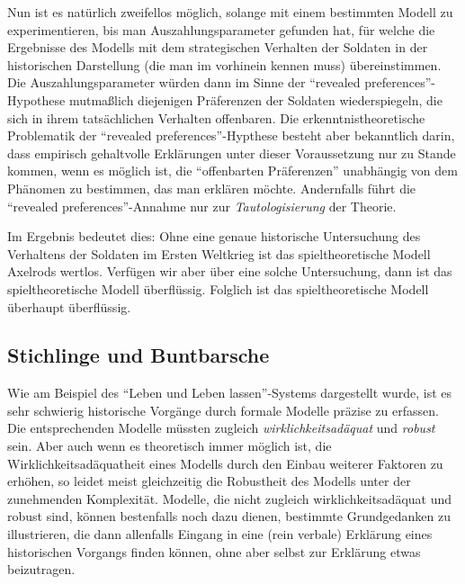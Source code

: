 \documentclass[12pt,a4paper,ngerman]{article}
\begin{document}
Nun ist es natürlich zweifellos möglich, solange mit einem bestimmten
Modell zu experimentieren, bis man Auszahlungsparameter gefunden hat,
für welche die Ergebnisse des Modells mit dem strategischen Verhalten
der Soldaten in der historischen Darstellung (die man im vorhinein
kennen muss) übereinstimmen. Die Auszahlungsparameter würden dann im
Sinne der "`revealed preferences"'-Hypothese mutmaßlich diejenigen
Präferenzen der Soldaten wiederspiegeln, die sich in ihrem
tatsächlichen Verhalten offenbaren. Die erkenntnistheoretische
Problematik der "`revealed preferences"'-Hypthese besteht aber
bekanntlich darin, dass empirisch gehaltvolle Erklärungen unter dieser
Voraussetzung nur zu Stande kommen, wenn es möglich ist, die
"`offenbarten Präferenzen"' unabhängig von dem Phänomen zu bestimmen,
das man erklären möchte. Andernfalls führt die "`revealed
preferences"'-Annahme nur zur {\em Tautologisierung} der
Theorie.


Im Ergebnis bedeutet dies: Ohne eine genaue historische Untersuchung
des Verhaltens der Soldaten im Ersten Weltkrieg ist das
spieltheoretische Modell Axelrods wertlos. Verfügen wir aber über eine
solche Untersuchung, dann ist das spieltheoretische Modell
überflüssig. Folglich ist das spieltheoretische Modell überhaupt
überflüssig.


\subsection{Stichlinge und Buntbarsche}

Wie am Beispiel des "`Leben und Leben lassen"'-Systems dargestellt
wurde, ist es sehr schwierig historische Vorgänge durch formale
Modelle präzise zu erfassen. Die entsprechenden Modelle müssten
zugleich {\em wirklichkeitsadäquat} und {\em robust} sein. Aber auch
wenn es theoretisch immer möglich ist, die Wirklichkeitsadäquatheit
eines Modells durch den Einbau weiterer Faktoren zu erhöhen, so leidet
meist gleichzeitig die Robustheit des Modells unter der zunehmenden
Komplexität. Modelle, die nicht zugleich wirklichkeitsadäquat und
robust sind, können bestenfalls noch dazu dienen, bestimmte
Grundgedanken zu illustrieren, die dann allenfalls Eingang in eine
(rein verbale) Erklärung eines historischen Vorgangs finden können,
ohne aber selbst zur Erklärung etwas beizutragen. 
\end{document}
